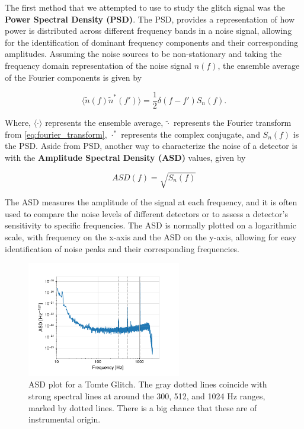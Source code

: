 \documentclass[12pt]{article}
\begin{document}
\noindent The first method that we attempted to use to study the glitch signal was the \textbf{Power Spectral Density (PSD)}. The PSD, provides a representation of how power is distributed across different frequency bands in a noise signal\cite{Oppenheim_2009}, allowing for the identification of dominant frequency components and their corresponding amplitudes. Assuming the noise sources to be non-stationary and taking the frequency domain representation of the noise signal $n(f)$, the ensemble average of the Fourier components is given by \cite{Li:2013lza}

\begin{equation}
  \langle \tilde{n}(f) \tilde{n}^*(f') \rangle = \frac{1}{2} \delta(f - f') S_n(f).
  \label{eq:psd_relation}
\end{equation}

\medskip
\noindent Where, $\langle \cdot \rangle$ represents the ensemble average, $\tilde{\cdot}$ represents the Fourier transform from \ref{eq:fourier_transform}, $\cdot^\ast$ represents the complex conjugate, and $S_n(f)$ is the PSD. Aside from PSD, another way to characterize the noise of a detector is with the \textbf{Amplitude Spectral Density (ASD)} values, given by

\begin{equation}
  ASD(f) = \sqrt{S_n(f)}
\end{equation}

\noindent The ASD measures the amplitude of the signal at each frequency, and it is often used to compare the noise levels of different detectors or to assess a detector's sensitivity to specific frequencies. The ASD is normally plotted on a logarithmic scale, with frequency on the x-axis and the ASD on the y-axis, allowing for easy identification of noise peaks and their corresponding frequencies.

\begin{figure}[H]
  \centering
  \includegraphics[width=0.6\textwidth]{images/unwhitened_asd.pdf}
  \caption{ASD plot for a Tomte Glitch. The gray dotted lines coincide with strong spectral lines at around the 300, 512, and 1024 Hz ranges, marked by dotted lines. There is a big chance that these are of instrumental origin.}
  \label{fig:asdtomte}
\end{figure}
\end{document}
